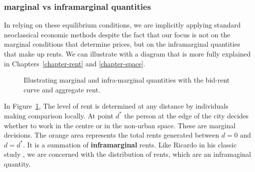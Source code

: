 \subsubsection{\Gls{marginal} vs \gls{inframarginal} quantities}
In relying on these equilibrium conditions, we are implicitly applying standard neoclassical economic methods despite the fact that our focus is not on the \gls{marginal} conditions that determine prices, but on the \gls{inframarginal} quantities that make up rents. We can illustrate with a diagram that is more fully explained in Chapters~\ref{chapter-rent} and \ref{chapter-space}. 

\vspace{.3cm}

\begin{figure}[h!t!]
\centering

\caption{Illustrating marginal and infra-marginal quantities with the bid-rent curve and aggregate rent.}
\label{fig-land-rent-as-inframarginal}
\end{figure}

In Figure~\ref{fig-land-rent-as-inframarginal}, The level of rent is determined at any distance by individuals making comparison locally. At point $d^*$ the person at the edge of the city decides whether to work in the centre or in the non-urban space. These are \gls{marginal} decisions. The orange area represents the total rents generated between $d=0$ and $d=d^*$. It is a summation of \textbf{\gls{inframarginal}} rents. Like Ricardo in his classic study \cite{ricardoEssayInfluenceLow1815}, we are concerned with the distribution of rents, which are an inframaginal quantity.





